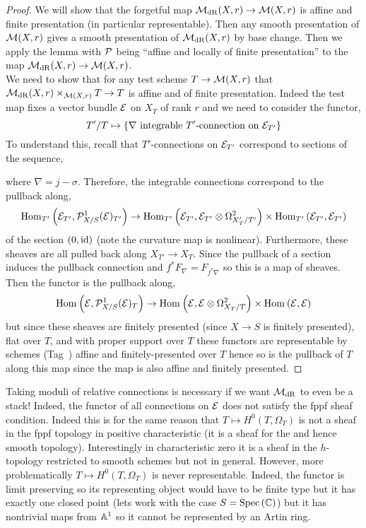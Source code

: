 \documentclass[12pt]{article}
\begin{document}
\begin{proof}
We will show that the forgetful map $\mathcal{M}_{\mathrm{dR}}(X, r) \to \mathcal{M}(X, r)$ is affine and finite presentation (in particular representable). Then any smooth presentation of $\mathcal{M}(X,r)$ gives a smooth presentation of $\mathcal{M}_{\mathrm{dR}}(X, r)$ by base change. Then we apply the lemma with $\mathcal{P}$ being ``affine and locally of finite presentation'' to the map $\mathcal{M}_{\mathrm{dR}}(X, r) \to \mathcal{M}(X, r)$. 
\bigskip\\
We need to show that for any test scheme $T \to \mathcal{M}(X, r)$ that $\mathcal{M}_{\mathrm{dR}}(X, r) \times_{\mathcal{M}(X, r)} T \to T$ is affine and of finite presentation. Indeed the test map fixes a vector bundle $\mathcal{E}$ on $X_T$ of rank $r$ and we need to consider the functor,
\[ T'/T \mapsto \{ \nabla \text{ integrable } T'\text{-connection on } \mathcal{E}_{T'} \} \]
To understand this, recall that $T'$-connections on $\mathcal{E}_{T'}$ correspond to sections of the sequence,
\begin{center}
\end{center}
where $\nabla = j - \sigma$. Therefore, the integrable connections correspond to the pullback along,
\[ \mathrm{Hom}_{T'} \left( \mathcal{E}_{T'}, \mathcal{P}^1_{X/S}(\mathcal{E})_{T'} \right) \to \mathrm{Hom}_{T'} \left( \mathcal{E}_{T'}, \mathcal{E}_{T'} \otimes \Omega^2_{X'_T/T'} \right) \times \mathrm{Hom}_{T'} \left( \mathcal{E}_{T'}, \mathcal{E}_{T'} \right) \]
of the section $(0, \mathrm{id})$ (note the curvature map is nonlinear). Furthermore, these sheaves are all pulled back along $X_{T'} \to X_T$. Since the pullback of a section induces the pullback connection and $f^* F_{\nabla} = F_{f^* \nabla}$ so this is a map of sheaves. Then the functor is the pullback along,
\[ \mathrm{Hom}_{} \left( \mathcal{E}, \mathcal{P}^1_{X/S}(\mathcal{E})_{T} \right) \to \mathrm{Hom}_{} \left( \mathcal{E}, \mathcal{E} \otimes \Omega^2_{X_T/T} \right) \times \mathrm{Hom}_{} \left( \mathcal{E}, \mathcal{E} \right) \]
but since these sheaves are finitely presented (since $X \to S$ is finitely presented), flat over $T$, and with proper support over $T$ these functors are representable by schemes (Tag~) affine and finitely-presented over $T$ hence so is the pullback of $T$ along this map since the map is also affine and finitely presented.
\end{proof}

\begin{rmk}
Taking moduli of relative connections is necessary if we want $\mathcal{M}_{\mathrm{dR}}$ to even be a stack! Indeed, the functor of all connections on $\mathcal{E}$ does not satisfy the fppf sheaf condition. Indeed this is for the same reason that $T \mapsto H^0(T, \Omega_T)$ is not a sheaf in the fppf topology in positive characteristic (it is a sheaf for the \etale and hence smooth topology). Interestingly in characteristic zero it is a sheaf in the $h$-topology restricted to smooth schemes but not in general. However, more problematically $T \mapsto H^0(T, \Omega_T)$ is never representable. Indeed, the functor is limit preserving so its representing object would have to be finite type but it has exactly one closed point (lets work with the case $S = \mathrm{Spec}\left( \mathbb{C} \right)$) but it has nontrivial maps from $\mathbb{A}^1$ so it cannot be represented by an Artin ring. 
\end{rmk}
\end{document}
